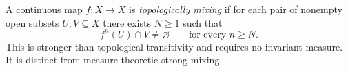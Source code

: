 
A continuous map $f:X\to X$ is \emph{topologically mixing} if for each pair of nonempty open subsets $U,V\subseteq X$ there exists $N\ge1$ such that
\[
f^n(U)\cap V\ne\varnothing\qquad\text{for every }n\ge N.
\]
This is stronger than topological transitivity and requires no invariant measure. It is distinct from measure-theoretic strong mixing.
